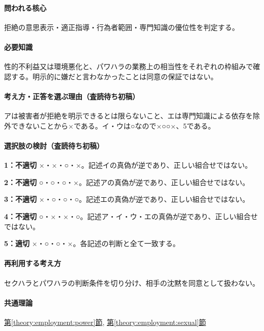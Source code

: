 \paragraph{問われる核心} 拒絶の意思表示・適正指導・行為者範囲・専門知識の優位性を判定する。

\paragraph{必要知識} 性的不利益又は環境悪化と、パワハラの業務上の相当性をそれぞれの枠組みで確認する。明示的に嫌だと言わなかったことは同意の保証ではない。

\paragraph{考え方・正答を選ぶ理由（査読待ち初稿）} アは被害者が拒絶を明示できるとは限らないこと、エは専門知識による依存を除外できないことから×である。イ・ウは○なので×○○×、5である。

\paragraph{選択肢の検討（査読待ち初稿）}\mbox{}\par

\noindent\textbf{1：不適切} ×・×・○・×。記述イの真偽が逆であり、正しい組合せではない。\par

\noindent\textbf{2：不適切} ○・○・○・×。記述アの真偽が逆であり、正しい組合せではない。\par

\noindent\textbf{3：不適切} ×・○・○・○。記述エの真偽が逆であり、正しい組合せではない。\par

\noindent\textbf{4：不適切} ○・×・×・○。記述ア・イ・ウ・エの真偽が逆であり、正しい組合せではない。\par

\noindent\textbf{5：適切} ×・○・○・×。各記述の判断と全て一致する。\par

\paragraph{再利用する考え方} セクハラとパワハラの判断条件を切り分け、相手の沈黙を同意として扱わない。

\paragraph{共通理論} \hyperref[theory:employment:power]{第\ref*{theory:employment:power}節}, \hyperref[theory:employment:sexual]{第\ref*{theory:employment:sexual}節}

